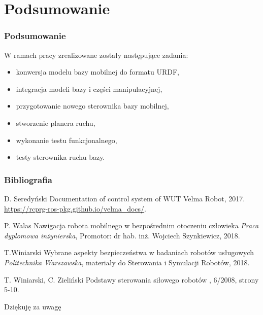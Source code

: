 \section{Podsumowanie}

\begin{frame}
    \frametitle{Podsumowanie}
    W ramach pracy zrealizowane zostały następujące zadania:
    \begin{itemize}
        \item konwersja modelu bazy mobilnej do formatu URDF,
        \item integracja modeli bazy i części manipulacyjnej,
        \item przygotowanie nowego sterownika bazy mobilnej,
        \item stworzenie planera ruchu,
        \item wykonanie testu funkcjonalnego,
        \item testy sterownika ruchu bazy.
    \end{itemize}
\end{frame}

\begin{frame}[plain]
    \addtocounter{framenumber}{-1}
    \frametitle{Bibliografia}
    \footnotesize{
    \begin{thebibliography}{99} %
     D. Seredyński
    \newblock Documentation of control system of WUT Velma Robot, 2017.
    \newblock \url{https://rcprg-ros-pkg.github.io/velma\_docs/}.
    
     P. Walas
    \newblock Nawigacja robota mobilnego w bezpośrednim otoczeniu człowieka
    \newblock \emph{Praca dyplomowa inżynierska}, Promotor: dr hab. inż. Wojciech Szynkiewicz, 2018.
    
     T.Winiarski
    \newblock Wybrane aspekty bezpieczeństwa w badaniach robotów usługowych
    \newblock \emph{Politechnika Warszawska}, materiały do Sterowania i Symulacji Robotów, 2018.
    
     T. Winiarski, C. Zieliński
    \newblock Podstawy sterowania siłowego robotów
    , 6/2008, strony 5-10.
    
    \end{thebibliography}
    }
    \end{frame}

\begin{frame}[plain]
\addtocounter{framenumber}{-1}
\Huge{\centerline{Dziękuję za uwagę}}
\end{frame}
